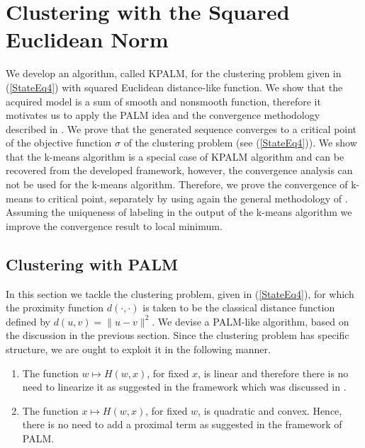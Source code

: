  \chapter{Clustering with the Squared Euclidean Norm} \label{Chptr3}

\noindent \noindent \hrulefill

We develop an algorithm, called KPALM, for the clustering problem given in (\ref{StateEq4}) with squared Euclidean distance-like function. We show that the acquired model is a sum of smooth and nonsmooth function, therefore it motivates us to apply the PALM idea and the convergence methodology described in . We prove that the generated sequence converges to a critical point of the objective function $\sigma$ of the clustering problem (see (\ref{StateEq4})). We show that the k-means algorithm is a special case of KPALM algorithm and can be recovered from the developed framework, however, the convergence analysis can not be used for the k-means algorithm. Therefore, we prove the convergence of k-means to critical point, separately by using again the general methodology of . Assuming the uniqueness of labeling in the output of the k-means algorithm we improve the convergence result to local minimum.

\noindent \noindent \hrulefill

\section{Clustering with PALM}\label{State_Clustering_SqNorm}

In this section we tackle the clustering problem, given in (\ref{StateEq4}), for which the proximity function $d(\cdot,\cdot)$ is taken to be the classical distance function defined by $d(u,v) = \|u-v\|^2$. We devise a PALM-like algorithm, based on the discussion in the previous section.
Since the clustering problem has specific structure, we are ought to exploit it in the following manner.
\begin{enumerate}[(1)]
	\item The function $w \mapsto H(w,x)$, for fixed $x$, is linear and therefore there is no need to linearize it as suggested in the framework which was discussed in .
	\item The function $x \mapsto H(w,x)$, for fixed $w$, is quadratic and convex. Hence, there is no need to add a proximal term as suggested in the framework of PALM.
\end{enumerate}

